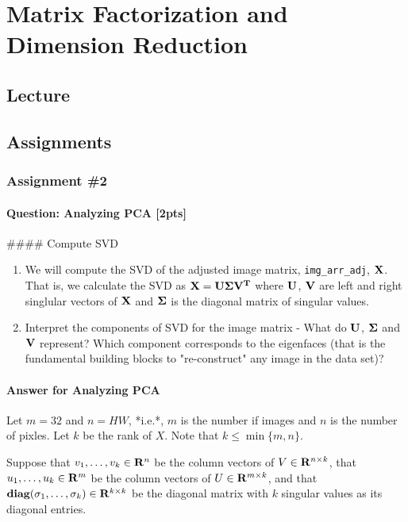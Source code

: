 \section{Matrix Factorization and Dimension Reduction}


\subsection{Lecture}


\subsection{Assignments}

\subsubsection{Assignment \#2}

\paragraph{Question: Analyzing PCA [2pts]}


\#\#\#\# Compute SVD

\begin{enumerate}
\item We will compute the SVD of the adjusted image matrix, \verb+img_arr_adj+, $\bf{X}$. That is, we calculate the SVD as $\bf{X} = \bf{U} \bf{\Sigma}  \bf{V}^T$ where $\bf{U}$, $\bf{V}$ are left and right singlular vectors of $\bf{X}$ and $\bf{\Sigma}$ is the diagonal matrix of singular values. 
\item Interpret the components of SVD for the image matrix - What do $\bf{U}$, $\bf{\Sigma}$ and $\bf{V}$ represent? Which component corresponds to the eigenfaces (that is the fundamental building blocks to "re-construct" any image in the data set)?
\end{enumerate}




\paragraph{Answer for Analyzing PCA}

Let $m=32$ and $n=HW$, *i.e.*, $m$ is the number if images and $n$ is the number of pixles. Let $k$ be the rank of $X$. Note that $k\leq\min\{m, n\}$.

Suppose that $v_1, \ldots, v_k \in \mathbf{R}^n$ be the column vectors of $V\in\mathbf{R}^{n\times k}$,
that $u_1, \ldots, u_k \in \mathbf{R}^m$ be the column vectors of $U\in\mathbf{R}^{m\times k}$,
and that $\mathbf{diag}(\sigma_1,\ldots,\sigma_k)\in\mathbf{R}^{k\times k}$ be the diagonal matrix with $k$ singular values as its diagonal entries.

